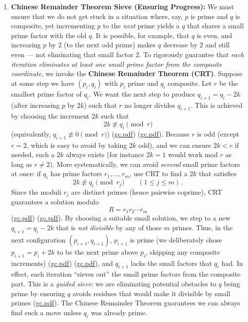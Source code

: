 \documentclass[12pt]{article}
\begin{document}
\begin{enumerate}[leftmargin=*, label=\arabic*.]
  \item \textbf{Chinese Remainder Theorem Sieve (Ensuring Progress):} We must ensure that we do not get stuck in a situation where, say, $p$ is prime and $q$ is composite, yet incrementing $p$ to the \emph{next} prime yields a $q$ that shares a small prime factor with the old $q$. It is possible, for example, that $q$ is even, and increasing $p$ by $2$ (to the next odd prime) makes $q$ decrease by $2$ and still even --- not eliminating that small factor $2$. To rigorously guarantee that \emph{each iteration eliminates at least one small prime factor from the composite coordinate}, we invoke the \textbf{Chinese Remainder Theorem (CRT)}. Suppose at some step we have $(p_i,q_i)$ with $p_i$ prime and $q_i$ composite. Let $r$ be the smallest prime factor of $q_i$. We want the next step to produce $q_{i+1}=q_i - 2k$ (after increasing $p$ by $2k$) such that $r$ no longer divides $q_{i+1}$. This is achieved by choosing the increment $2k$ such that 
  \[
  2k \not\equiv q_i \pmod r
  \]
  (equivalently, $q_{i+1}\not\equiv 0 \pmod r$) (\href{file://file-7ZYYwSHWVa83XEVTrEhg5z#:~:text=For%20instance%2C%20to%20avoid%20%24q_,i%2B1%7D%29%24%20where}{gc.pdf}) (\href{file://file-7ZYYwSHWVa83XEVTrEhg5z#:~:text=guarantees%20that%20we%20can%20find,q%24%20composite%2C%20thereby%20increasing%20the}{gc.pdf}). Because $r$ is odd (except $r=2$, which is easy to avoid by taking $2k$ odd), and we can ensure $2k < r$ if needed, such a $2k$ always exists (for instance $2k=1$ would work mod $r$ as long as $r\neq 2$). More systematically, we can avoid \emph{several} small prime factors at once: if $q_i$ has prime factors $r_1,\dots,r_m$, use CRT to find a $2k$ that satisfies 
  \[
  2k \not\equiv q_i \pmod{r_j} \qquad (1\le j\le m)\,.
  \]
  Since the moduli $r_j$ are distinct primes (hence pairwise coprime), CRT guarantees a solution modulo 
  \[
  R = r_1 r_2\cdots r_m
  \]
  (\href{file://file-7ZYYwSHWVa83XEVTrEhg5z#:~:text=so%20that%20%24q_%7Bi%2B1%7D%24%20is%20prime%2C%20we%20have}{gc.pdf}) (\href{file://file-7ZYYwSHWVa83XEVTrEhg5z#:~:text=of%20small%20prime%20divisors%20by,i%2B1}{gc.pdf}). By choosing a suitable small solution, we step to a new $q_{i+1} = q_i - 2k$ that is \emph{not divisible} by any of those $m$ primes. Thus, in the next configuration $(p_{i+1}, q_{i+1})$, $p_{i+1}$ is prime (we deliberately chose $p_{i+1}=p_i+2k$ to be the next prime above $p_i$, skipping any composite increments) (\href{file://file-7ZYYwSHWVa83XEVTrEhg5z#:~:text=guarantees%20that%20we%20can%20find,q%24%20composite%2C%20thereby%20increasing%20the}{gc.pdf}) (\href{file://file-7ZYYwSHWVa83XEVTrEhg5z#:~:text=%24p_,thereby%20increasing%20the%20likelihood%20that}{gc.pdf}), and $q_{i+1}$ lacks the small factors that $q_i$ had. In effect, each iteration “sieves out” the small prime factors from the composite part. This is a \emph{guided sieve}: we are eliminating potential obstacles to $q$ being prime by ensuring $q$ avoids residues that would make it divisible by small primes (\href{file://file-7ZYYwSHWVa83XEVTrEhg5z#:~:text=%24q_,i%2B1%7D%24%20is%20prime%2C%20we%20have}{gc.pdf}). The Chinese Remainder Theorem guarantees we can always find such a move unless $q_i$ was already prime.


\end{enumerate}
\end{document}
